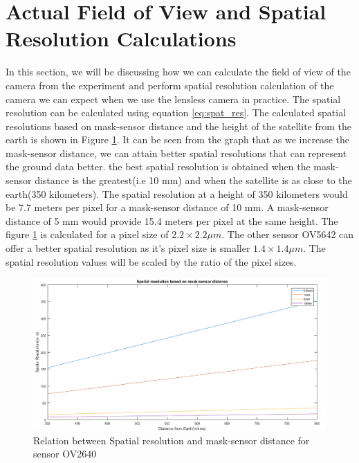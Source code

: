 \section{Actual Field of View and Spatial Resolution Calculations}
In this section, we will be discussing how we can calculate the field of view of the camera from the experiment and perform spatial resolution calculation of the camera we can expect when we use the lensless camera in practice. The spatial resolution can be calculated using equation \ref{eq:spat_res}. The calculated spatial resolutions based on mask-sensor distance and the height of the satellite from the earth is shown in Figure \ref{fig:spat-res-graph-1}. It can be seen from the graph that as we increase the mask-sensor distance, we can attain better spatial resolutions that can represent the ground data better. the best spatial resolution is obtained when the mask-sensor distance is the greatest(i.e 10 mm) and when the satellite is as close to the earth(350 kilometers). The spatial resolution at a height of 350 kilometers would be 7.7 meters per pixel for a mask-sensor distance of 10 mm. A mask-sensor distance of 5 mm would provide 15.4 meters per pixel at the same height. The figure \ref{fig:spat-res-graph-1} is calculated for a pixel size of $2.2 \times 2.2 \mu m$. The other sensor OV5642 can offer a better spatial resolution as it's pixel size is smaller $1.4 \times 1.4 \mu m$. The spatial resolution values will be scaled by the ratio of the pixel sizes. 

\begin{figure}[]
\centering
\includegraphics[width = \linewidth]{pics/spatial-res-calc}
\caption{Relation between Spatial resolution and mask-sensor distance for sensor OV2640}
\label{fig:spat-res-graph-1}
\end{figure}

